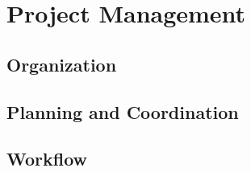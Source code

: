 \chapter{Project Management}
\section{Organization}
\lipsum[5-6]
\section{Planning and Coordination}
\lipsum[7-8]
\section{Workflow}
\lipsum[9-10]
